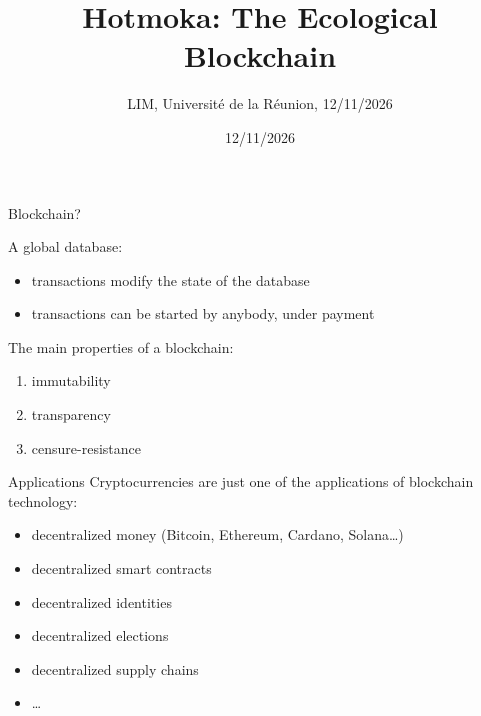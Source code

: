 \documentclass[11pt]{beamer}  %
\subtitle{LIM, Universit\'e de la R\'eunion, 12/11/2026}
\title{Hotmoka: The Ecological Blockchain}
\institute{Universit\`a di Verona, Italy}
\date{12/11/2026}
\begin{document}
\begin{frame}
  \titlepage
\end{frame}

\begin{frame}{Blockchain?}

  A global database:
  \begin{itemize}
  \item transactions modify the state of the database
  \item transactions can be started by anybody, under payment
  \end{itemize}
  \bigskip
  The main properties of a blockchain:
  \begin{enumerate}
  \item immutability
  \item transparency
  \item censure-resistance
  \end{enumerate}

\end{frame}

\begin{frame}{Applications}
  Cryptocurrencies are just one of the applications of blockchain technology:
  \begin{itemize}
  \item decentralized money (Bitcoin, Ethereum, Cardano, Solana\ldots)
  \item decentralized smart contracts
  \item decentralized identities
  \item decentralized elections
  \item decentralized supply chains
  \item \ldots
  \end{itemize}
\end{frame}
\end{document}
